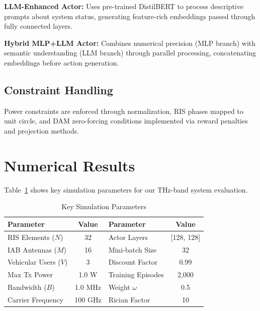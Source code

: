 \documentclass[conference]{IEEEtran}
\begin{document}
\textbf{LLM-Enhanced Actor:} Uses pre-trained DistilBERT to process descriptive prompts about system status, generating feature-rich embeddings passed through fully connected layers.

\textbf{Hybrid MLP+LLM Actor:} Combines numerical precision (MLP branch) with semantic understanding (LLM branch) through parallel processing, concatenating embeddings before action generation.

\subsection{Constraint Handling}

Power constraints are enforced through normalization, RIS phases mapped to unit circle, and DAM zero-forcing conditions implemented via reward penalties and projection methods.

\section{Numerical Results}

Table~\ref{tab:sim_params} shows key simulation parameters for our THz-band system evaluation.

\begin{table}[t]
\centering
\caption{Key Simulation Parameters}
\label{tab:sim_params}
\begin{tabular}{|l|c||l|c|}
\hline
\textbf{Parameter} & \textbf{Value} & \textbf{Parameter} & \textbf{Value} \\
\hline
RIS Elements ($N$) & 32 & Actor Layers & [128, 128] \\
IAB Antennas ($M$) & 16 & Mini-batch Size & 32 \\
Vehicular Users ($V$) & 3 & Discount Factor & 0.99 \\
Max Tx Power & 1.0 W & Training Episodes & 2,000 \\
Bandwidth ($B$) & 1.0 MHz & Weight $\omega$ & 0.5 \\
Carrier Frequency & 100 GHz & Rician Factor & 10 \\
\hline
\end{tabular}
\end{table}
\end{document}
